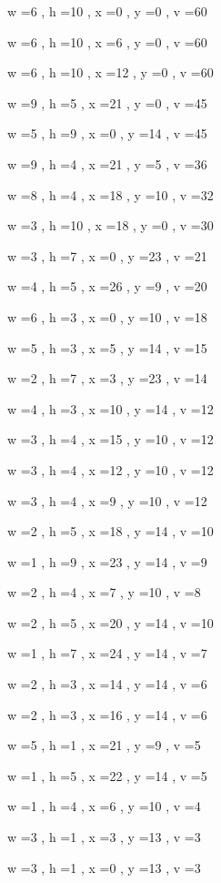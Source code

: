 \documentclass[11pt]{article}
\begin{document}
w =6 , h =10 , x =0 , y =0 , v =60
\par
w =6 , h =10 , x =6 , y =0 , v =60
\par
w =6 , h =10 , x =12 , y =0 , v =60
\par
w =9 , h =5 , x =21 , y =0 , v =45
\par
w =5 , h =9 , x =0 , y =14 , v =45
\par
w =9 , h =4 , x =21 , y =5 , v =36
\par
w =8 , h =4 , x =18 , y =10 , v =32
\par
w =3 , h =10 , x =18 , y =0 , v =30
\par
w =3 , h =7 , x =0 , y =23 , v =21
\par
w =4 , h =5 , x =26 , y =9 , v =20
\par
w =6 , h =3 , x =0 , y =10 , v =18
\par
w =5 , h =3 , x =5 , y =14 , v =15
\par
w =2 , h =7 , x =3 , y =23 , v =14
\par
w =4 , h =3 , x =10 , y =14 , v =12
\par
w =3 , h =4 , x =15 , y =10 , v =12
\par
w =3 , h =4 , x =12 , y =10 , v =12
\par
w =3 , h =4 , x =9 , y =10 , v =12
\par
w =2 , h =5 , x =18 , y =14 , v =10
\par
w =1 , h =9 , x =23 , y =14 , v =9
\par
w =2 , h =4 , x =7 , y =10 , v =8
\par
w =2 , h =5 , x =20 , y =14 , v =10
\par
w =1 , h =7 , x =24 , y =14 , v =7
\par
w =2 , h =3 , x =14 , y =14 , v =6
\par
w =2 , h =3 , x =16 , y =14 , v =6
\par
w =5 , h =1 , x =21 , y =9 , v =5
\par
w =1 , h =5 , x =22 , y =14 , v =5
\par
w =1 , h =4 , x =6 , y =10 , v =4
\par
w =3 , h =1 , x =3 , y =13 , v =3
\par
w =3 , h =1 , x =0 , y =13 , v =3
\par
\newpage
\end{document}
